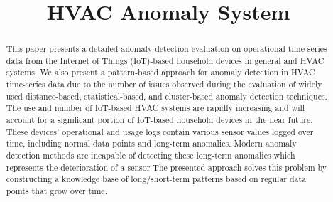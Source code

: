 \documentclass[conference]{IEEEtran}
\begin{document}
\title{HVAC Anomaly System\\
}


\author{
\and
{}
\and 
{}
\and 
{}

}

\maketitle

\begin{abstract}
This paper presents a detailed anomaly detection evaluation on operational time-series data from the Internet of Things (IoT)-based household devices in general and HVAC systems. We also present a pattern-based approach for anomaly detection in HVAC time-series data due to the number of issues observed during the evaluation of widely used distance-based, statistical-based, and cluster-based anomaly detection techniques. The use and number of IoT-based HVAC systems are rapidly increasing and will account for a significant portion of IoT-based household devices in the near future. These devices' operational and usage logs contain various sensor values logged over time, including normal data points and long-term anomalies. Modern anomaly detection methods are incapable of detecting these long-term anomalies which represents the deterioration of a sensor The presented approach solves this problem by constructing a knowledge base of long/short-term patterns based on regular data points that grow over time.
\end{abstract}
\end{document}
